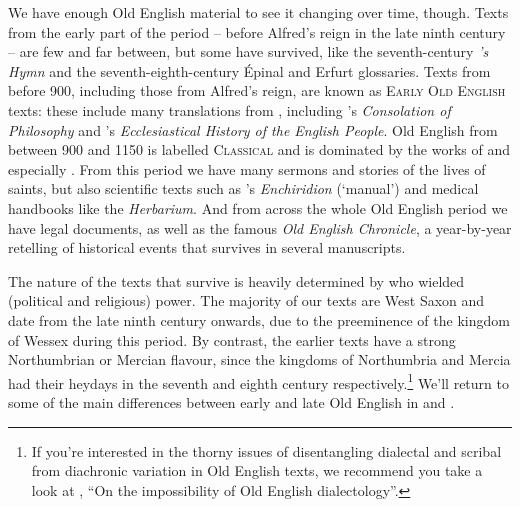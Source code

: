 We have enough Old English material to see it changing over time, though. Texts from the early part of the period -- before Alfred's reign in the late ninth century -- are few and far between, but some have survived, like the seventh-century \emph{'s Hymn} and the seventh-eighth-century Épinal and Erfurt glossaries. Texts from before 900, including those from Alfred's reign, are known as \textsc{Early Old English} texts: these include many translations from , including 's \emph{Consolation of Philosophy} and 's \emph{Ecclesiastical History of the English People}. Old English from between 900 and 1150 is labelled \textsc{Classical} and is dominated by the works of  and especially . From this period we have many sermons and stories of the lives of saints, but also scientific texts such as 's \emph{Enchiridion} (`manual') and medical handbooks like the \emph{Herbarium}. And from across the whole Old English period we have legal documents, as well as the famous \textit{Old English Chronicle}, a year-by-year retelling of historical events that survives in several manuscripts.

The nature of the texts that survive is heavily determined by who wielded (political and religious) power. The majority of our texts are West Saxon and date from the late ninth century onwards, due to the preeminence of the kingdom of Wessex during this period. By contrast, the earlier texts have a strong Northumbrian or Mercian flavour, since the kingdoms of Northumbria and Mercia had their heydays in the seventh and eighth century respectively.\footnote{If you're interested in the thorny issues of disentangling dialectal and scribal from diachronic variation in Old English texts, we recommend you take a look at \citet{Hogg1988}, ``On the impossibility of Old English dialectology''.} We'll return to some of the main differences between early and late Old English in  and .



